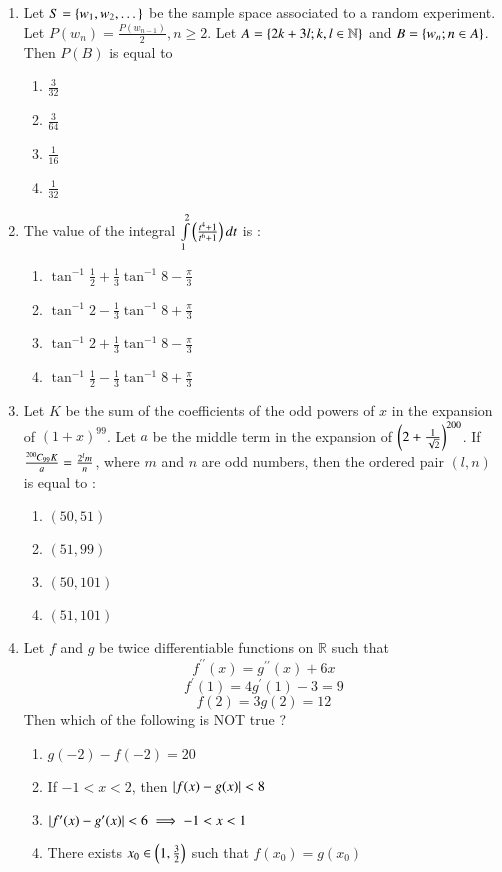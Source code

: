\documentclass[journal,12pt,twocolumn]{IEEEtran}
\theoremstyle{remark}
\begin{document}
\begin{enumerate}
    \item Let $S=\left\{w_1,w_2,\dots\right\}$ be the sample space associated to a random experiment. Let $P(w_n)=\frac{P(w_{n-1})}{2},n\geq2$. Let $A=\left\{2k+3l;k,l\in \mathbb{N}\right\}$ and $B=\left\{w_n;n\in A\right\}$. Then $P(B)$ is equal to
        \begin{enumerate}
            \item $\frac{3}{32}$
            \item $\frac{3}{64}$
            \item $\frac{1}{16}$
            \item $\frac{1}{32}$
        \end{enumerate}

    \item The value of the integral $\int\limits_1^2\left(\frac{t^4+1}{t^6+1}\right)dt$ is :
        \begin{enumerate}
            \item $\tan^{-1}\frac{1}{2}+\frac{1}{3}\tan^{-1}8-\frac{\pi}{3}$
            \item $\tan^{-1}2-\frac{1}{3}\tan^{-1}8+\frac{\pi}{3}$
            \item $\tan^{-1}2+\frac{1}{3}\tan^{-1}8-\frac{\pi}{3}$
            \item $\tan^{-1}\frac{1}{2}-\frac{1}{3}\tan^{-1}8+\frac{\pi}{3}$
        \end{enumerate}

    \item Let $K$ be the sum of the coefficients of the odd powers of $x$ in the expansion of $(1+x)^{99}$. Let $a$ be the middle term in the expansion of $\left(2+\frac{1}{\sqrt{2}}\right)^{200}$. If $\frac{{{}^{200}\mkern-1muC_{99}}K}{a}=\frac{2^lm}{n}$, where $m$ and $n$ are odd numbers, then the ordered pair $(l,n)$ is equal to :
        \begin{enumerate}
            \item $(50,51)$
            \item $(51,99)$
            \item $(50,101)$
            \item $(51,101)$
        \end{enumerate}

    \item Let $f$ and $g$ be twice differentiable functions on $\mathbb{R}$ such that
        $$f^{\prime\prime}(x)=g^{\prime\prime}(x)+6x$$
        $$f^\prime(1)=4g^\prime(1)-3=9$$
        $$f(2)=3g(2)=12$$
        Then which of the following is NOT true ?
        \begin{enumerate}
            \item $g(-2)-f(-2)=20$
            \item If $-1<x<2$, then $\left\vert f(x)-g(x)\right\vert<8$
            \item $\left\vert f^\prime(x)-g^\prime(x)\right\vert<6\implies-1<x<1$
            \item There exists $x_0\in\left(1,\frac{3}{2}\right)$ such that $f(x_0)=g(x_0)$
        \end{enumerate}



\end{enumerate}
\end{document}

